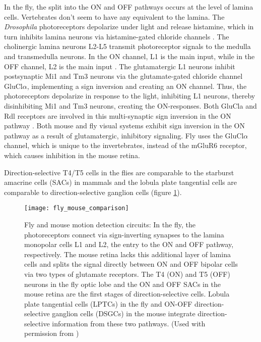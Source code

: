 In the fly, the split into the ON and OFF pathways occurs at the level of lamina cells. Vertebrates don't seem to have any equivalent to the lamina. The \textit{Drosophila} photoreceptors depolarize under light and release histamine, which in turn inhibits lamina neurons via histamine-gated chloride channels \parencite{Hardie1989}. The cholinergic lamina neurons L2-L5 transmit photoreceptor signals to the medulla and transmedulla neurons. In the ON channel, L1 is the main input, while in the OFF channel, L2 is the main input \parencite{Joesch2010}. The glutamatergic L1 neurons inhibit postsynaptic Mi1 and Tm3 neurons via the glutamate-gated chloride channel GluCl$\alpha$, implementing a sign inversion and creating an ON channel. Thus, the photoreceptors depolarize in response to the light, inhibiting L1 neurons, thereby disinhibiting Mi1 and Tm3 neurons, creating the ON-responses. Both GluCla and Rdl receptors are involved in this multi-synaptic sign inversion in the ON pathway \parencite{Molina2019}. Both mouse and fly visual systems exhibit sign inversion in the ON pathway as a result of glutamatergic, inhibitory signaling. Fly uses the GluCl$\alpha$ channel, which is unique to the invertebrates, instead of the mGluR6 receptor, which causes inhibition in the mouse retina.

Direction-selective T4/T5 cells in the flies are comparable to the starburst amacrine cells (SACs) in mammals and the lobula plate tangential cells are comparable to direction-selective ganglion cells (figure \ref{fig:flymouse}).
\begin{figure}
\centering
\hspace*{-1cm} 
\texttt{[image: fly\_mouse\_comparison]}
\caption[Fly and mouse motion detection circuits] {Fly and mouse motion detection circuits: In the fly, the photoreceptors connect via sign-inverting synapses to the lamina monopolar cells L1 and L2, the entry to the ON and OFF pathway, respectively. The mouse retina lacks this additional layer of lamina cells and splits the signal directly between ON and OFF bipolar cells via two types of glutamate receptors. The T4 (ON) and T5 (OFF) neurons in the fly optic lobe and the ON and OFF SACs in the mouse retina are the first stages of direction-selective cells. Lobula plate tangential cells (LPTCs) in the fly and ON-OFF direction-selective ganglion cells (DSGCs) in the mouse integrate direction-selective information from these two pathways. (Used with permission from \cite{Borst2015})} 
\label{fig:flymouse}
\end{figure}

